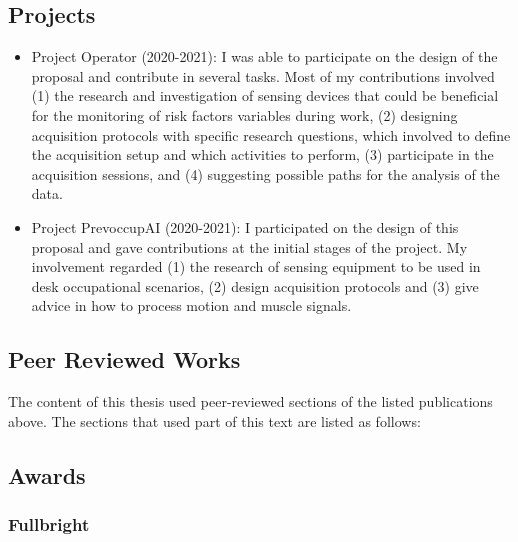 \subsection{Projects}

\begin{itemize}
\item Project Operator (2020-2021): I was able to participate on the design of the proposal and contribute in several tasks. Most of my contributions involved (1) the research and investigation of sensing devices that could be beneficial for the monitoring of risk factors variables during work, (2) designing acquisition protocols with specific research questions, which involved to define the acquisition setup and which activities to perform, (3) participate in the acquisition sessions, and (4) suggesting possible paths for the analysis of the data.
\item Project PrevoccupAI (2020-2021): I participated on the design of this proposal and gave contributions at the initial stages of the project. My involvement regarded (1) the research of sensing equipment to be used in desk occupational scenarios, (2) design acquisition protocols and (3) give advice in how to process motion and muscle signals.
\end{itemize}

\subsection{Peer Reviewed Works}

The content of this thesis used peer-reviewed sections of the listed publications above. The sections that used part of this text are listed as follows:

%



\subsection{Awards}

\subsubsection{Fullbright}

